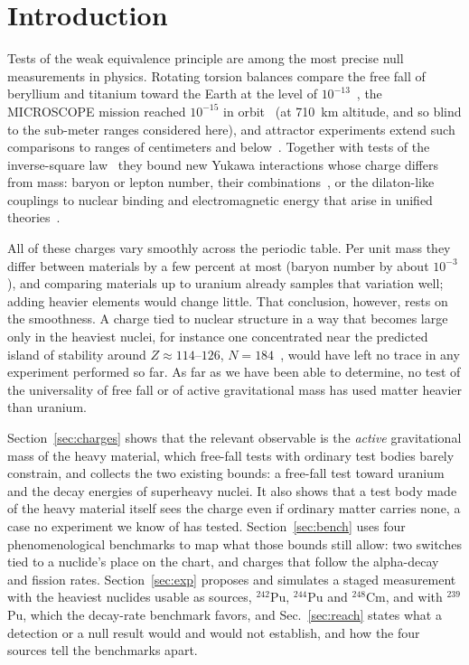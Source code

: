 \documentclass[aps,prd,onecolumn,superscriptaddress,floatfix,nofootinbib]{revtex4-2}
\newcommand{\Pu}[1]{$^{#1}$Pu}
\newcommand{\nuc}[2]{$^{#1}$#2}
\begin{document}
\section{Introduction}\label{sec:intro}

Tests of the weak equivalence principle are among the most precise null measurements in physics. Rotating
torsion balances compare the free fall of beryllium and titanium toward the Earth at the level of
$10^{-13}$~\cite{Schlamminger2008,Wagner2012}, the MICROSCOPE mission reached $10^{-15}$ in orbit~\cite{Touboul2022}
(at 710~km altitude, and so blind to the sub-meter ranges considered here),
and attractor experiments extend such comparisons to ranges of centimeters and below~\cite{Smith2000,Adelberger2009}.
Together with tests of the inverse-square law~\cite{Hoskins1985,Lee2020} they bound new Yukawa interactions whose
charge differs from mass: baryon or lepton number, their combinations~\cite{Fischbach1999,Adelberger2009}, or the
dilaton-like couplings to nuclear binding and electromagnetic energy that arise in unified theories~\cite{Damour2010}.

All of these charges vary smoothly across the periodic table. Per unit mass they differ between materials by a few
percent at most (baryon number by about $10^{-3}$), and comparing materials up to uranium already samples that
variation well; adding heavier elements would change little. That conclusion, however, rests on the smoothness. A
charge tied to nuclear structure in a way that becomes large only in the heaviest nuclei, for instance one
concentrated near the predicted island of stability around $Z\approx114$--$126$,
$N=184$~\cite{Bender1999,Oganessian2015}, would have left no trace in any experiment performed so far. As far as we
have been able to determine, no test of the universality of free fall or of active gravitational mass has used
matter heavier than uranium.

Section~\ref{sec:charges} shows that the relevant observable is the \emph{active} gravitational mass of the heavy
material, which free-fall tests with ordinary test bodies barely constrain, and collects the two existing bounds: a
free-fall test toward uranium and the decay energies of superheavy nuclei. It also shows that a test body made of
the heavy material itself sees the charge even if ordinary matter carries none, a case no experiment we know of has
tested.
Section~\ref{sec:bench} uses four
phenomenological benchmarks to map what those bounds still allow: two switches tied to a nuclide's place on the
chart, and charges that follow the alpha-decay and fission rates. Section~\ref{sec:exp} proposes and simulates a
staged measurement with the heaviest nuclides usable as sources, \Pu{242}, \Pu{244} and
\nuc{248}{Cm}, and with \Pu{239}, which the decay-rate benchmark favors, and Sec.~\ref{sec:reach} states what a
detection or a null result would and would not establish, and how the four sources tell the benchmarks apart.
\end{document}
